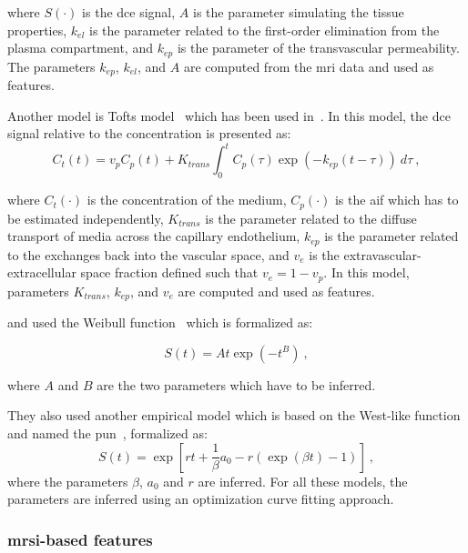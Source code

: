 \noindent where $S(\cdot)$ is the \ac{dce} signal, $A$ is the parameter simulating the tissue properties, $k_{el}$ is the parameter related to the first-order elimination from the plasma compartment, and $k_{ep}$ is the parameter of the transvascular permeability.
The parameters $k_{ep}$, $k_{el}$, and $A$ are computed from the \ac{mri} data and used as features.

Another model is Tofts model~\cite{Tofts1997} which has been used in~\cite{Langer2009,Giannini2013,Niaf2011,Niaf2012,Mazzetti2011,lehaire2014computer,giannini2015fully}.
In this model, the \ac{dce} signal relative to the concentration is presented as:
\begin{equation}
	C_t(t) = v_p C_p(t) + K_{trans} \int_{0}^{t} C_p(\tau) \exp( -k_{ep}(t-\tau) ) \ d\tau \ ,
	\label{eq:tofts} 
\end{equation}

\noindent where $C_t(\cdot)$ is the concentration of the medium, $C_p(\cdot)$ is the \ac{aif} which has to be estimated independently, $K_{trans}$ is the parameter related to the diffuse transport of media across the capillary endothelium, $k_{ep}$ is the parameter related to the exchanges back into the vascular space, and $v_e$ is the extravascular-extracellular space fraction defined such that $v_e = 1 - v_p$.
In this model, parameters $K_{trans}$, $k_{ep}$, and $v_e$ are computed and used as features.

\citeauthor{Mazzetti2011} and \citeauthor{giannini2015fully} used the Weibull function~\cite{Mazzetti2011,Giannini2013,giannini2015fully} which is formalized as:

\begin{equation}
	S(t) = A t \exp( -t^{B} ) \ ,
	\label{eq:weibull}
\end{equation}

\noindent where $A$ and $B$ are the two parameters which have to be inferred.

They also used another empirical model which is based on the West-like function and named the \ac{pun}~\cite{Castorina2006}, formalized as:
\begin{equation}
	S(t) = \exp \left[ r t + \frac{1}{\beta} a_0 - r \left( \exp( \beta t ) - 1 \right) \right] \ ,
	\label{eq:pun}
\end{equation}
\noindent where the parameters $\beta$, $a_0$ and $r$ are inferred.
For all these models, the parameters are inferred using an optimization curve fitting approach.

\subsubsection{\acs*{mrsi}-based features}\label{subsubsec:chp3:img-clas:CADX-fea-dec:MRSI-fea}

